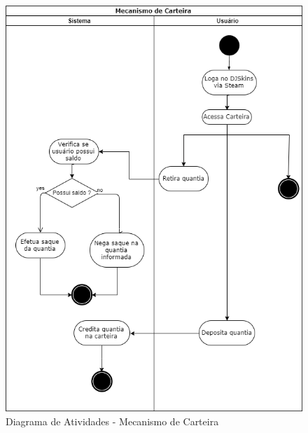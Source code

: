 	\begin{figure}[!htb]
		\centering
		\includegraphics[scale=0.6]{Imagens/mec-carteira.png}
		\caption{Diagrama de Atividades - Mecanismo de Carteira}
	\end{figure}